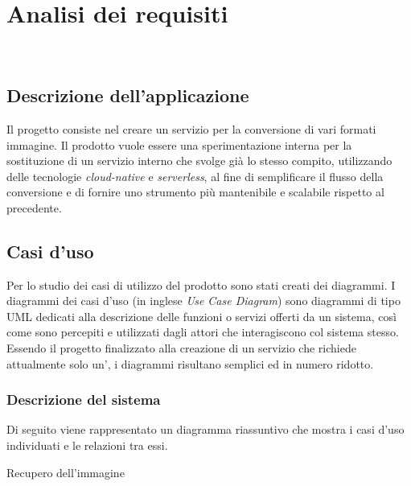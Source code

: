 
\chapter{Analisi dei requisiti}
\label{cap:analisi-requisiti}

\\

\section{Descrizione dell'applicazione}
Il progetto consiste nel creare un servizio per la
conversione di vari formati immagine. Il prodotto vuole essere una
sperimentazione interna per la sostituzione di un servizio interno che svolge
già lo stesso compito, utilizzando delle tecnologie \emph{cloud-native} e
\emph{serverless}, al fine di semplificare il flusso della conversione e di
fornire uno strumento più mantenibile e scalabile rispetto al precedente.\\


\section{Casi d'uso}

Per lo studio dei casi di utilizzo del prodotto sono stati creati dei diagrammi.
I diagrammi dei casi d'uso (in inglese \emph{Use Case Diagram}) sono diagrammi di tipo \gls{UML} dedicati
alla descrizione delle funzioni o servizi offerti da un sistema, così come sono
percepiti e utilizzati dagli attori che interagiscono col sistema stesso.
Essendo il progetto finalizzato alla creazione di un servizio che richiede
attualmente solo un', i diagrammi risultano semplici ed in numero ridotto.

\subsection{Descrizione del sistema}
Di seguito viene rappresentato un diagramma riassuntivo che mostra i casi d'uso
individuati e le relazioni tra essi.

\begin{usecase}{1}{Recupero dell'immagine}
    \label{uc:recupero-immagine}
\end{usecase}

